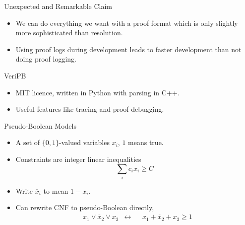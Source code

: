\documentclass[aspectratio=169,compress,10pt]{beamer}
\begin{document}
\begin{frame}[fragile]{Unexpected and Remarkable Claim}
    \begin{itemize}
        \item We can do everything we want with a proof format which is only slightly more
            sophisticated than resolution.
        \item <2-> Using proof logs during development leads to faster development than not doing proof logging.
    \end{itemize}
\end{frame}

\begin{frame}{VeriPB}
    \begin{center}
        \bigskip
    \end{center}
    \begin{itemize}
        \item MIT licence, written in Python with parsing in C++.
        \item Useful features like tracing and proof debugging.
    \end{itemize}
\end{frame}

\begin{frame}{Pseudo-Boolean Models}
    \begin{itemize}
        \item A set of $\{ 0, 1 \}$-valued variables $x_i$, $1$ means true.
        \item Constraints are integer linear inequalities \[
                \sum_i c_i x_i \ge C
            \]
        \item Write $\overline{x}_i$ to mean $1 - x_i$.
        \item Can rewrite CNF to pseudo-Boolean directly, \begin{align*}
                & x_1 \vee \overline{x}_2 \vee x_3 & \leftrightarrow && x_1 + \overline{x}_2 + x_3 \ge 1
        \end{align*}
    \end{itemize}
\end{frame}
\end{document}
